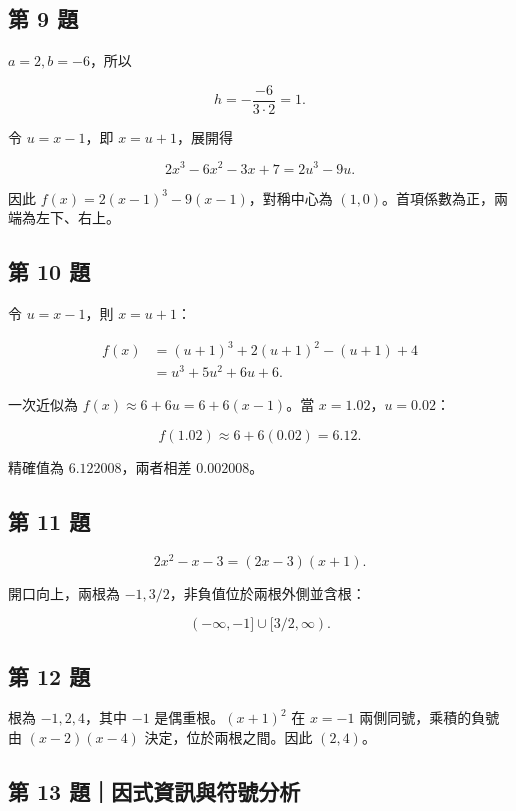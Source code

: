 \documentclass[11pt,a4paper]{article}
\begin{document}
\subsection{第 9 題}\label{ux7b2c-9-ux984c}

\(a=2,b=-6\)，所以

\[
h=-\frac{-6}{3\cdot2}=1.
\]

令 \(u=x-1\)，即 \(x=u+1\)，展開得

\[
2x^3-6x^2-3x+7=2u^3-9u.
\]

因此 \(\boxed{f(x)=2(x-1)^3-9(x-1)}\)，對稱中心為 \(\boxed{(1,0)}\)。首項係數為正，兩端為左下、右上。

\subsection{第 10 題}\label{ux7b2c-10-ux984c}

令 \(u=x-1\)，則 \(x=u+1\)：

\[
\begin{aligned}
f(x)&=(u+1)^3+2(u+1)^2-(u+1)+4\\
&=u^3+5u^2+6u+6.
\end{aligned}
\]

一次近似為 \(\boxed{f(x)\approx6+6u=6+6(x-1)}\)。當 \(x=1.02\)，\(u=0.02\)：

\[
f(1.02)\approx6+6(0.02)=\boxed{6.12}.
\]

精確值為 \(6.122008\)，兩者相差 \(0.002008\)。

\subsection{第 11 題}\label{ux7b2c-11-ux984c}

\[
2x^2-x-3=(2x-3)(x+1).
\]

開口向上，兩根為 \(-1,3/2\)，非負值位於兩根外側並含根：

\[
\boxed{(-\infty,-1]\cup[3/2,\infty)}.
\]

\subsection{第 12 題}\label{ux7b2c-12-ux984c}

根為 \(-1,2,4\)，其中 \(-1\) 是偶重根。\((x+1)^2\) 在 \(x=-1\) 兩側同號，乘積的負號由 \((x-2)(x-4)\) 決定，位於兩根之間。因此 \(\boxed{(2,4)}\)。

\subsection{第 13 題｜因式資訊與符號分析}\label{ux7b2c-13-ux984cux56e0ux5f0fux8cc7ux8a0aux8207ux7b26ux865fux5206ux6790}
\end{document}
